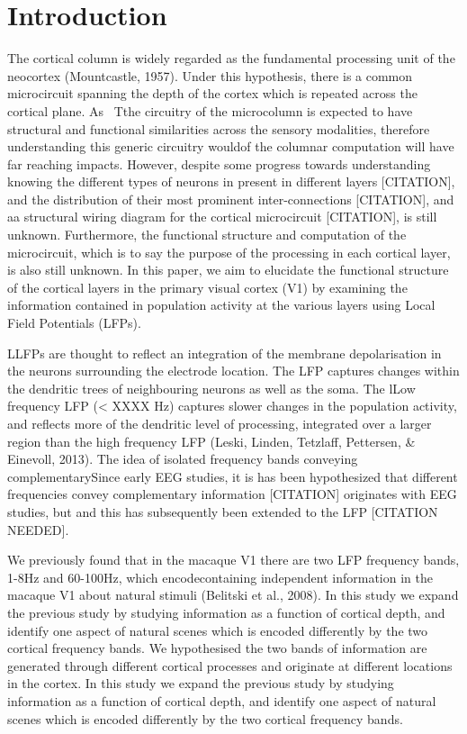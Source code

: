 \documentclass{article}
\begin{document}
\section[Introduction]{Introduction}
The cortical column is widely regarded as the fundamental processing unit of the neocortex (Mountcastle, 1957). Under this hypothesis, there is a common microcircuit spanning the depth of the cortex which is repeated across the cortical plane. As \ Tthe circuitry of the microcolumn is expected to have structural and functional similarities across the sensory modalities, therefore understanding this generic circuitry wouldof the columnar computation will have far reaching impacts. However, despite some progress towards understanding knowing the different types of neurons in present in different layers [CITATION], and the distribution of their most prominent inter-connections [CITATION], and aa structural wiring diagram for the cortical microcircuit [CITATION], is still unknown. Furthermore, the functional structure and computation of the microcircuit, which is to say the purpose of the processing in each cortical layer, is also still unknown. In this paper, we aim to elucidate the functional structure of the cortical layers in the primary visual cortex (V1) by examining the information contained in population activity at the various layers using Local Field Potentials (LFPs).

LLFPs are thought to reflect an integration of the membrane depolarisation in the neurons surrounding the electrode location. The LFP captures changes within the dendritic trees of neighbouring neurons as well as the soma. The lLow frequency LFP ({\textless} XXXX Hz) captures slower changes in the population activity, and reflects more of the dendritic level of processing, integrated over a larger region than the high frequency LFP (Leski, Linden, Tetzlaff, Pettersen, \& Einevoll, 2013). The idea of isolated frequency bands conveying complementarySince early EEG studies, it is has been hypothesized that different frequencies convey complementary information [CITATION] originates with EEG studies, but and this has subsequently been extended to the LFP [CITATION NEEDED]. 

We previously found that in the macaque V1 there are two LFP frequency bands, 1-8Hz and 60-100Hz, which encodecontaining independent information in the macaque V1 about natural stimuli (Belitski et al., 2008). In this study we expand the previous study by studying information as a function of cortical depth, and identify one aspect of natural scenes which is encoded differently by the two cortical frequency bands. We hypothesised the two bands of information are generated through different cortical processes and originate at different locations in the cortex. In this study we expand the previous study by studying information as a function of cortical depth, and identify one aspect of natural scenes which is encoded differently by the two cortical frequency bands.
\end{document}
